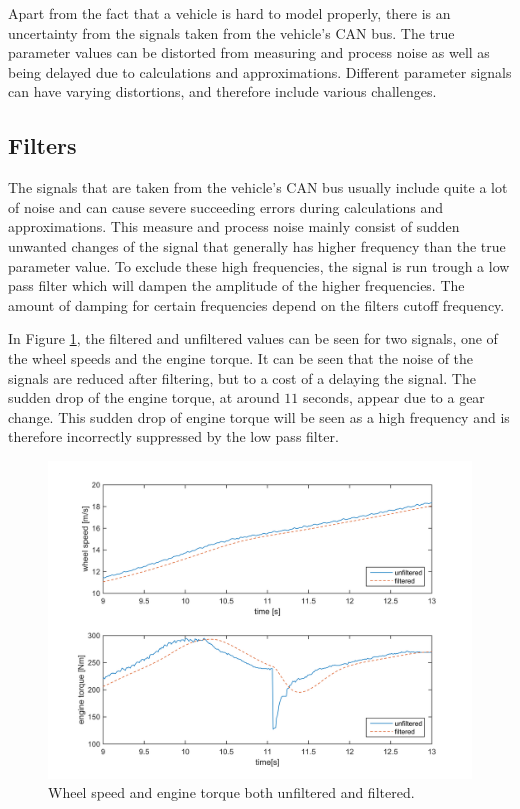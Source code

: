 Apart from the fact that a vehicle is hard to model properly, there is an uncertainty from the signals taken from the vehicle's CAN bus. The true parameter values can be distorted from measuring and process noise as well as being delayed due to calculations and approximations. Different parameter signals can have varying distortions, and therefore include various challenges.

\subsection{Filters}

The signals that are taken from the vehicle's CAN bus usually include quite a lot of noise and can cause severe succeeding errors during calculations and approximations. This measure and process noise mainly consist of sudden unwanted changes of the signal that generally has higher frequency than the true parameter value. To exclude these high frequencies, the signal is run trough a low pass filter which will dampen the amplitude of the higher frequencies. The amount of damping for certain frequencies depend on the filters cutoff frequency. 

In Figure \ref{filter_and_no}, the filtered and unfiltered values can be seen for two signals, one of the wheel speeds and the engine torque. It can be seen that the noise of the signals are reduced after filtering, but to a cost of a delaying the signal. The sudden drop of the engine torque, at around $ 11 $ seconds, appear due to a gear change. This sudden drop of engine torque will be seen as a high frequency and is therefore incorrectly suppressed by the low pass filter.

\begin{figure}[h]
	\centering
	\includegraphics[width=1.0\textwidth]{Pictures/filter_and_no}
	\caption {Wheel speed and engine torque both unfiltered and filtered.}
	\label{filter_and_no}
\end{figure}

